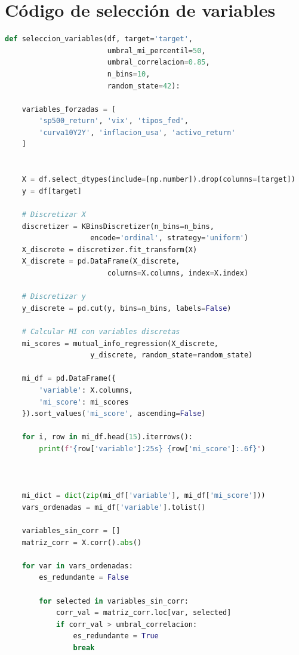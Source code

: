 \section{Código de selección de variables}
\label{sec:codigo_seleccion_variables}
\begin{lstlisting}[language=Python, caption=Función para seleccionar variables, label=lst:seleccion_variables]
def seleccion_variables(df, target='target', 
                        umbral_mi_percentil=50,
                        umbral_correlacion=0.85,
                        n_bins=10,
                        random_state=42):

    variables_forzadas = [
        'sp500_return', 'vix', 'tipos_fed', 
        'curva10Y2Y', 'inflacion_usa', 'activo_return'
    ]
    

    X = df.select_dtypes(include=[np.number]).drop(columns=[target]) 
    y = df[target] 

    # Discretizar X
    discretizer = KBinsDiscretizer(n_bins=n_bins, 
                    encode='ordinal', strategy='uniform') 
    X_discrete = discretizer.fit_transform(X) 
    X_discrete = pd.DataFrame(X_discrete, 
                        columns=X.columns, index=X.index) 
    
    # Discretizar y 
    y_discrete = pd.cut(y, bins=n_bins, labels=False)
    
    # Calcular MI con variables discretas
    mi_scores = mutual_info_regression(X_discrete, 
                    y_discrete, random_state=random_state) 
    
    mi_df = pd.DataFrame({
        'variable': X.columns,
        'mi_score': mi_scores
    }).sort_values('mi_score', ascending=False) 

    for i, row in mi_df.head(15).iterrows():
        print(f"{row['variable']:25s} {row['mi_score']:.6f}")
    
    
        
    mi_dict = dict(zip(mi_df['variable'], mi_df['mi_score'])) 
    vars_ordenadas = mi_df['variable'].tolist()
    
    variables_sin_corr = []
    matriz_corr = X.corr().abs() 
    
    for var in vars_ordenadas: 
        es_redundante = False
        
        for selected in variables_sin_corr: 
            corr_val = matriz_corr.loc[var, selected]
            if corr_val > umbral_correlacion:
                es_redundante = True
                break
        

\end{lstlisting}
